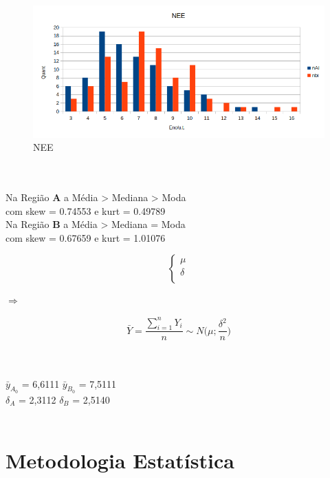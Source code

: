 \hspace{1.8cm}
\begin{minipage}[!b]{0.40\linewidth}
\begin{figure}[H]
\centering
\includegraphics[scale=0.5]{./image/NEE.png}
\caption{NEE}
\label{NEE}
\end{figure}
\end{minipage}
\\
\\
\noindent
Na Região \textbf{A} a Média > Mediana > Moda \\ 
com skew = 0.74553  e kurt = 0.49789 \\
Na Região \textbf{B} a Média > Mediana = Moda \\
com skew = 0.67659 e kurt = 1.01076 \\
\begin{minipage}[l]{0pt}
$$\left\lbrace\begin{array}{c}
\mu \\
\delta \\
\end{array}\right.$$
\end{minipage}
\hspace{3cm} $\Longrightarrow$ \hspace{3cm}
\begin{minipage}[l]{0pt}
\[\bar{Y}=\frac{\sum_{i=1}^nY_i}{n}\sim N \big(\mu;\frac{\delta^2}{n}\big)\]
\end{minipage}\\
\\
$\bar{y}_{A_0}$ = 6,6111 \qquad $\bar{y}_{B_0}$ = 7,5111 \\
$\delta_A$ = 2,3112 \qquad $\delta_B$ = 2,5140 \\
\\
\newpage
\section{Metodologia Estatística}\label{Metodos}
\noindent
